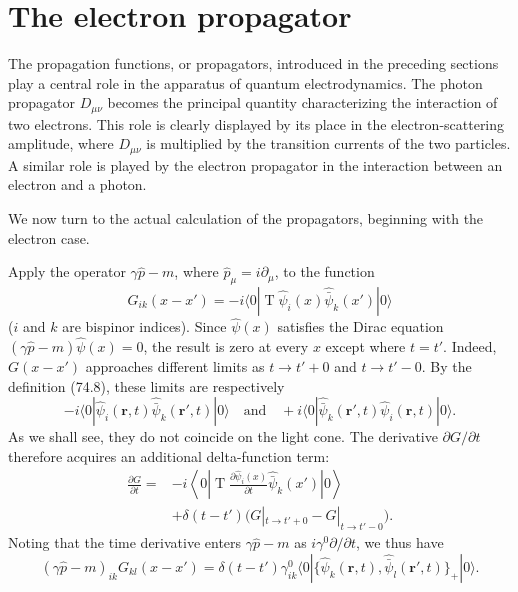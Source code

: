 \section{The electron propagator}

The propagation functions, or propagators, introduced in the preceding sections play a central role in the apparatus of quantum electrodynamics. The photon propagator $D_{\mu\nu}$ becomes the principal quantity characterizing the interaction of two electrons. This role is clearly displayed by its place in the electron-scattering amplitude, where $D_{\mu\nu}$ is multiplied by the transition currents of the two particles. A similar role is played by the electron propagator in the interaction between an electron and a photon.

We now turn to the actual calculation of the propagators, beginning with the electron case.

Apply the operator $\gamma\hat p-m$, where $\hat p_\mu=i\partial_\mu$, to the function
\begin{equation}
G_{ik}(x-x')=-i\langle0|\mathop{\mathrm T}\hat\psi_i(x)\widehat{\bar\psi}_k(x')|0\rangle
\tag{75.1}
\label{eq:75.1}
\end{equation}
($i$ and $k$ are bispinor indices). Since $\hat\psi(x)$ satisfies the Dirac equation $(\gamma\hat p-m)\hat\psi(x)=0$, the result is zero at every $x$ except where $t=t'$. Indeed, $G(x-x')$ approaches different limits as $t\to t'+0$ and $t\to t'-0$. By the definition (74.8), these limits are respectively
\[
-i\langle0|\hat\psi_i(\mathbf r,t)\widehat{\bar\psi}_k(\mathbf r',t)|0\rangle
\quad\text{and}\quad
+i\langle0|\widehat{\bar\psi}_k(\mathbf r',t)\hat\psi_i(\mathbf r,t)|0\rangle.
\]
As we shall see, they do not coincide on the light cone. The derivative $\partial G/\partial t$ therefore acquires an additional delta-function term:
\begin{equation}
\begin{aligned}
\frac{\partial G}{\partial t}={}&-i\left\langle0\left|\mathop{\mathrm T}
\frac{\partial\hat\psi_i(x)}{\partial t}\widehat{\bar\psi}_k(x')\right|0\right\rangle\\
&+\delta(t-t')\bigl(G|_{t\to t'+0}-G|_{t\to t'-0}\bigr).
\end{aligned}
\tag{75.2}
\end{equation}
Noting that the time derivative enters $\gamma\hat p-m$ as $i\gamma^0\partial/\partial t$, we thus have
\begin{equation}
(\gamma\hat p-m)_{ik}G_{kl}(x-x')
=\delta(t-t')\gamma^0_{ik}\langle0|\{\hat\psi_k(\mathbf r,t),
\widehat{\bar\psi}_l(\mathbf r',t)\}_+|0\rangle.
\tag{75.3}
\end{equation}

